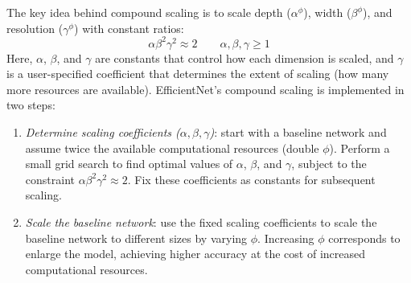 The key idea behind compound scaling is to scale depth ($\alpha^\phi$), width ($\beta^\phi$), and resolution ($\gamma^\phi$) with constant ratios: 
\[\alpha\beta^2\gamma^2\approx 2 \qquad \alpha,\beta,\gamma \geq 1\]
Here, $\alpha$, $\beta$, and $\gamma$ are constants that control how each dimension is scaled, and $\gamma$ is a user-specified coefficient that determines the extent of scaling (how many more resources are available). 
EfficientNet's compound scaling is implemented in two steps:
\begin{enumerate}
    \item \textit{Determine scaling coefficients ($\alpha, \beta, \gamma$)}: start with a baseline network and assume twice the available computational resources (double $\phi$).
        Perform a small grid search to find optimal values of $\alpha$, $\beta$, and $\gamma$, subject to the constraint $\alpha\beta^2\gamma^2\approx 2$.
        Fix these coefficients as constants for subsequent scaling.
    \item \textit{Scale the baseline network}: use the fixed scaling coefficients to scale the baseline network to different sizes by varying $\phi$.
        Increasing $\phi$ corresponds to enlarge the model, achieving higher accuracy at the cost of increased computational resources.
\end{enumerate}